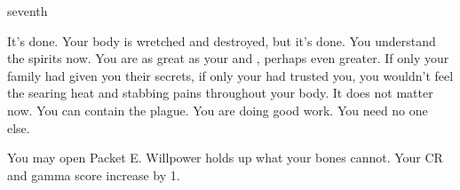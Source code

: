 \documentclass[greennotebook]{Pestilence} %
\begin{document}
\begin{page}{seventh}

It's done. Your body is wretched and destroyed, but it's done. You understand the spirits now. You are as great as your \cElder{\parent} and \cRebel{\sibling}, perhaps even greater. If only your family had given you their secrets, if only your \cElder{\parent} had trusted you, you wouldn't feel the searing heat and stabbing pains throughout your body. It does not matter now. You can contain the plague. You are doing good work. You need no one else. 

You may open Packet E. Willpower holds up what your bones cannot. Your CR and gamma score increase by 1.

\end{page}

\endnotebook
\end{document}
